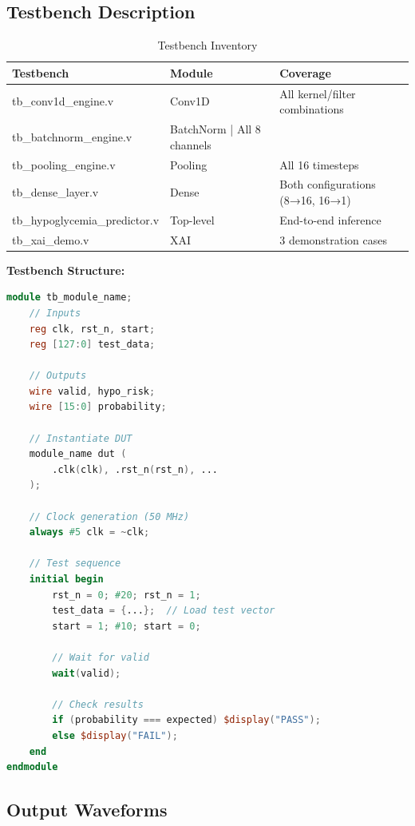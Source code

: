 \documentclass[11pt, a4paper]{article}
\begin{document}
\subsection{Testbench Description}

\begin{table}[H]
\centering
\caption{Testbench Inventory}
\label{tab:testbenches}
\begin{tabular}{@{}lll@{}}
\toprule
\textbf{Testbench} & \textbf{Module} & \textbf{Coverage} \\ \midrule
tb\_conv1d\_engine.v & Conv1D & All kernel/filter combinations \\
tb\_batchnorm\_engine.v & BatchNorm | All 8 channels \\
tb\_pooling\_engine.v & Pooling & All 16 timesteps \\
tb\_dense\_layer.v & Dense & Both configurations (8→16, 16→1) \\
tb\_hypoglycemia\_predictor.v & Top-level & End-to-end inference \\
tb\_xai\_demo.v & XAI & 3 demonstration cases \\ \bottomrule
\end{tabular}
\end{table}

\textbf{Testbench Structure:}
\begin{lstlisting}[language=Verilog, caption={Generic Testbench Structure}]
module tb_module_name;
    // Inputs
    reg clk, rst_n, start;
    reg [127:0] test_data;
    
    // Outputs
    wire valid, hypo_risk;
    wire [15:0] probability;
    
    // Instantiate DUT
    module_name dut (
        .clk(clk), .rst_n(rst_n), ...
    );
    
    // Clock generation (50 MHz)
    always #5 clk = ~clk;
    
    // Test sequence
    initial begin
        rst_n = 0; #20; rst_n = 1;
        test_data = {...};  // Load test vector
        start = 1; #10; start = 0;
        
        // Wait for valid
        wait(valid);
        
        // Check results
        if (probability === expected) $display("PASS");
        else $display("FAIL");
    end
endmodule
\end{lstlisting}

\subsection{Output Waveforms}
\end{document}
